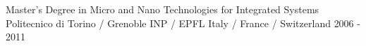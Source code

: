 



\begin{cventries}

  \cventry
    {Master's Degree in Micro and Nano Technologies for Integrated Systems} %
    {Politecnico di Torino / Grenoble INP / EPFL} %
    {Italy / France / Switzerland} %
    {2006 - 2011} %
    {}

\end{cventries}
